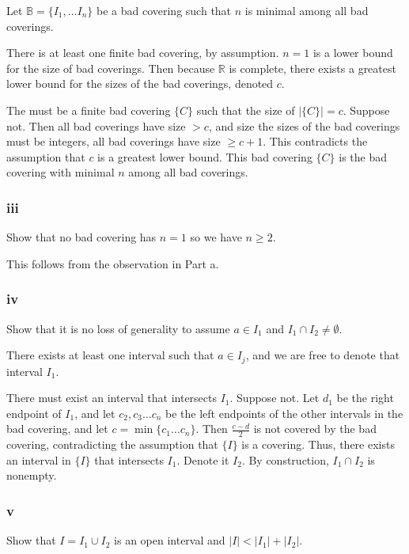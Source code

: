 \documentclass{article}
\newcommand{\R}{\mathbb{R}}
\newcommand{\B}{\mathbb{B}}
\begin{document}
Let $\B = \{I_1, \dots I_n\}$ be a bad covering such that $n$ is minimal among all bad coverings.

There is at least one finite bad covering, by assumption. $n=1$ is a lower bound for the size of bad coverings. Then because $\R$ is complete, there exists a greatest lower bound for the sizes of the bad coverings, denoted $c$.

The must be a finite bad covering $\{C\}$ such that the size of $|\{C\}| = c$. Suppose not. Then all bad coverings have size $> c$, and size the sizes of the bad coverings must be integers, all bad coverings have size $\geq c+1$. This contradicts the assumption that $c$ is a greatest lower bound. This bad covering $\{C\}$ is the bad covering with minimal $n$ among all bad coverings.

\subsubsection*{iii}

Show that no bad covering has $n=1$ so we have $n \geq 2$.

This follows from the observation in Part a.

\subsubsection*{iv}

Show that it is no loss of generality to assume $a \in I_1$ and $I_1 \cap I_2 \neq \emptyset$.

There exists at least one interval such that $a \in I_j$, and we are free to denote that interval $I_1$.

There must exist an interval that intersects $I_1$. Suppose not. Let $d_1$ be the right endpoint of $I_1$, and let $c_2, c_3 \dots c_n$ be the left endpoints of the other intervals in the bad covering, and let $c = \min\{c_1 \dots c_n\}$. Then $\frac{c-d}{2}$ is not covered by the bad covering, contradicting the assumption that $\{I\}$ is a covering. Thus, there exists an interval in $\{I\}$ that intersects $I_1$. Denote it $I_2$. By construction, $I_1 \cap I_2$ is nonempty.

\subsubsection*{v}

Show that $I = I_1 \cup I_2$ is an open interval and $|I| < |I_1| + |I_2|$.
\end{document}
